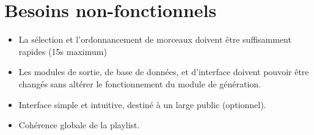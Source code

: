 \documentclass{article}
\begin{document}
\part{Besoins non-fonctionnels}

\begin{itemize}
\item La sélection et l'ordonnancement de morceaux doivent être suffisamment
rapides (15s maximum)
\item Les modules de sortie, de base de données, et d’interface doivent
pouvoir être changés sans altérer le fonctionnement du module de génération.
\item Interface simple et intuitive, destiné à un large public (optionnel).
\item Cohérence globale de la playlist.
\end{itemize}
\end{document}
